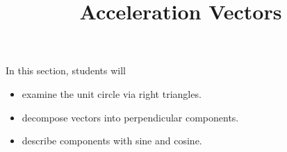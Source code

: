 \documentclass{ximera}
\title{Acceleration Vectors}
\begin{document}
\begin{abstract}
\end{abstract}
\maketitle







\begin{sectionOutcomes}
In this section, students will 

\begin{itemize}
\item examine the unit circle via right triangles.
\item decompose vectors into perpendicular components.
\item describe components with sine and cosine.
\end{itemize}
\end{sectionOutcomes}
\end{document}
